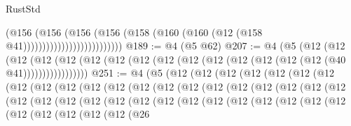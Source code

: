 \begin{lexlean}{RustStd}
\begin{coremodule}
{\begin{coremodule}
{{{{{{{{{{{{{{{{{{{{{{{{{{{{{{{{{{{{{{{{{{{{{{{{{{                                      (@156
                                        (@156
                                          (@156
                                            (@156
                                              (@158
                                                (@160 (@160 (@12 (@158 @41))))))))))))))))))))))))))
@189 := @4 (@5 @62)
@207 := @4
    (@5
      (@12
        (@12
          (@12 (@12 (@12 (@12 (@12 (@12 (@12 (@12 (@12 (@12 (@12 (@12 (@12 (@40 @41)))))))))))))))))
@251 := @4
    (@5
      (@12
        (@12
          (@12
            (@12
              (@12
                (@12
                  (@12
                    (@12
                      (@12
                        (@12
                          (@12
                            (@12
                              (@12
                                (@12
                                  (@12
                                    (@12
                                      (@12
                                        (@12
                                          (@12
                                            (@12
                                              (@12
                                                (@12
                                                  (@12
                                                    (@12
                                                      (@12
                                                        (@12
                                                          (@12
                                                            (@12
                                                              (@12
                                                                (@12
                                                                  (@12
                                                                    (@12
                                                                      (@12
                                                                        (@12
                                                                          (@12
                                                                            (@12
                                                                              (@12
                                                                                (@12
                                                                                  (@12
                                                                                    (@12
                                                                                      (@26
}}}}}}}}}}}}}}}}}}}}}}}}}}}}}}}}}}}}}}}}}}}}}}}}}}
\end{coremodule}}
\end{coremodule}
\end{lexlean}
